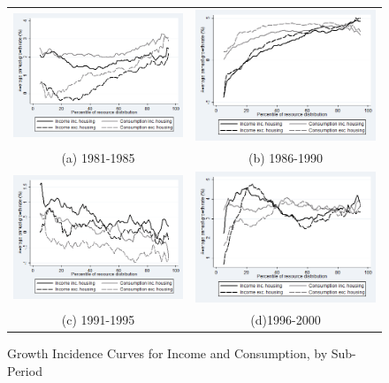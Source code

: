 \begin{figure}
\caption{Growth Incidence Curves for Income and Consumption, by Sub-Period}
\centering
\begin{tabular}{cc}
\includegraphics[width=.5\linewidth]{pictures/gic_1.png} & \includegraphics[width=.5\linewidth]{pictures/gic_2.png} \\
(a) 1981-1985 & (b) 1986-1990 \\
\includegraphics[width=.5\linewidth]{pictures/gic_3.png} & \includegraphics[width=.5\linewidth]{pictures/gic_4.png} \\
(c) 1991-1995 & (d)1996-2000 \\

\end{tabular}
\end{figure}
